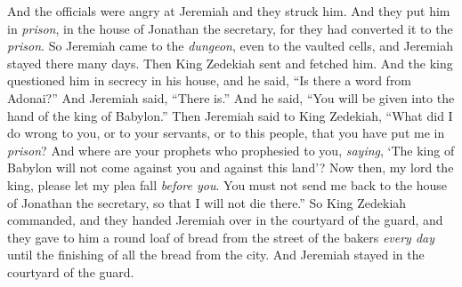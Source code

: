 \begin{biblechapter}
\verse And the officials were angry at Jeremiah and they struck him. And they put him in \textit{prison}, in the house of Jonathan the secretary, for they had converted it to the \textit{prison}.
\verse So Jeremiah came to the \textit{dungeon}, even to the vaulted cells, and Jeremiah stayed there many days.
\verse Then King Zedekiah sent and fetched him. And the king questioned him in secrecy in his house, and he said, “Is there a word from Adonai?” And Jeremiah said, “There is.” And he said, “You will be given into the hand of the king of Babylon.”
\verse Then Jeremiah said to King Zedekiah, “What did I do wrong to you, or to your servants, or to this people, that you have put me in \textit{prison}?
\verse And where are your prophets who prophesied to you, \textit{saying}, ‘The king of Babylon will not come against you and against this land’?
\verse Now then, my lord the king, please let my plea fall \textit{before you}. You must not send me back to the house of Jonathan the secretary, so that I will not die there.”
\verse So King Zedekiah commanded, and they handed Jeremiah over in the courtyard of the guard, and they gave to him a round loaf of bread from the street of the bakers \textit{every day} until the finishing of all the bread from the city. And Jeremiah stayed in the courtyard of the guard.
\end{biblechapter}

